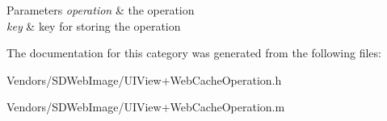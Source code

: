\begin{DoxyParams}{Parameters}
{\em operation} & the operation \\
\hline
{\em key} & key for storing the operation \\
\hline
\end{DoxyParams}


The documentation for this category was generated from the following files\+:\begin{DoxyCompactItemize}
\item 
Vendors/\+S\+D\+Web\+Image/U\+I\+View+\+Web\+Cache\+Operation.\+h\item 
Vendors/\+S\+D\+Web\+Image/U\+I\+View+\+Web\+Cache\+Operation.\+m\end{DoxyCompactItemize}
